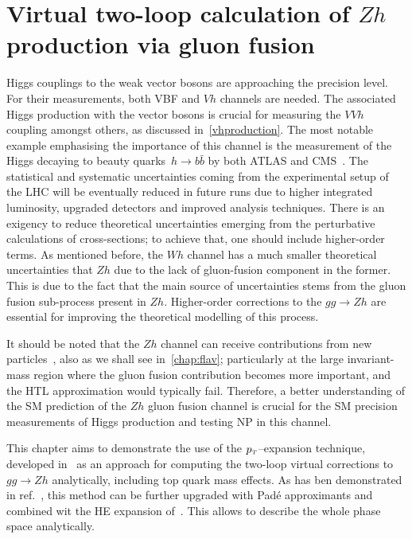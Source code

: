 \chapter{ Virtual two-loop calculation of  $Zh$ production via gluon fusion}\label{chap:hz}
\par  Higgs couplings to the weak vector bosons are approaching the precision level. For their measurements, both VBF and $Vh$ channels are needed. The associated Higgs production with the vector bosons is crucial for measuring the $VVh$ coupling amongst others, as discussed in~\autoref{vhproduction}. The most notable example emphasising the importance of this channel is the measurement of the Higgs decaying to beauty quarks~$h \rightarrow b \bar{b}$ by both ATLAS and CMS~\cite{Aaboud:2018zhk, Sirunyan:2018kst}. The statistical and systematic uncertainties coming from the experimental setup of the LHC will be eventually reduced in future runs due to higher integrated luminosity,  upgraded detectors and improved analysis techniques. There is an exigency to reduce theoretical uncertainties emerging from the perturbative calculations of cross-sections; to achieve that, one should include higher-order terms. As mentioned before, the $Wh$ channel has a much smaller theoretical uncertainties that $Zh$ due to the lack of gluon-fusion component in the former. This is due to the fact that the main source of uncertainties stems from the gluon fusion sub-process present in $Zh$. Higher-order corrections to the $gg \to Zh$ are essential for improving the theoretical modelling of this process. 
\par It should be noted that the $Zh$ channel can receive contributions from new particles~\cite{Harlander:2013mla}, also as we shall see in~\autoref{chap:flav}; particularly at the large invariant-mass region where the gluon fusion contribution becomes more important, and the HTL approximation would typically fail. Therefore, a better understanding of the SM prediction of the $Zh$ gluon fusion channel is crucial for the SM precision measurements of Higgs production and testing NP in this channel.  
\par This chapter aims to demonstrate the use of the $p_{\scriptscriptstyle T}$--expansion technique, developed in~\cite{Bonciani:2018omm} as an approach for computing the two-loop virtual corrections to $gg \to Zh$ analytically, including top quark mass effects. 
As has ben demonstrated in ref.~\cite{Bellafronte:2022jmo}, this method can be further upgraded with Pad\'e approximants and combined wit the HE expansion of~\cite{Davies:2020drs}. This allows to describe the whole phase space analytically.\\
